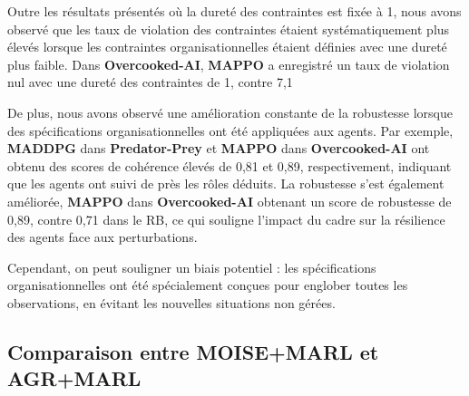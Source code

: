 Outre les résultats présentés où la dureté des contraintes est fixée à 1, nous avons observé que les taux de violation des contraintes étaient systématiquement plus élevés lorsque les contraintes organisationnelles étaient définies avec une dureté plus faible. Dans \textbf{Overcooked-AI}, \textbf{MAPPO} a enregistré un taux de violation nul avec une dureté des contraintes de 1, contre 7,1 %

De plus, nous avons observé une amélioration constante de la robustesse lorsque des spécifications organisationnelles ont été appliquées aux agents. Par exemple, \textbf{MADDPG} dans \textbf{Predator-Prey} et \textbf{MAPPO} dans \textbf{Overcooked-AI} ont obtenu des scores de cohérence élevés de 0,81 et 0,89, respectivement, indiquant que les agents ont suivi de près les rôles déduits. La robustesse s'est également améliorée, \textbf{MAPPO} dans \textbf{Overcooked-AI} obtenant un score de robustesse de 0,89, contre 0,71 dans le RB, ce qui souligne l'impact du cadre sur la résilience des agents face aux perturbations.

Cependant, on peut souligner un biais potentiel : les spécifications organisationnelles ont été spécialement conçues pour englober toutes les observations, en évitant les nouvelles situations non gérées.


\subsection{Comparaison entre MOISE+MARL et AGR+MARL}

